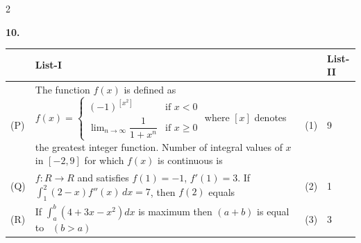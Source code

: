 \documentclass[10pt]{extarticle}
\newcommand{\qn}[1]{\par\smallskip\noindent\textbf{#1.}~}
\begin{document}
\begin{multicols}{2}
\qn{10} \begin{center}\footnotesize
\begin{tabular}{|p{0.6cm}|p{5.3cm}|p{0.6cm}|p{1.0cm}|}
\hline
 & \centering List-I & & \centering List-II\tabularnewline
\hline
(P) & The function $f(x)$ is defined as $f(x)=\begin{cases}(-1)^{[x^2]} & \text{if } x<0\\[2pt] \displaystyle\lim_{n\to\infty}\dfrac1{1+x^n} & \text{if } x\ge0\end{cases}$ where $[x]$ denotes the greatest integer function. Number of integral values of $x$ in $[-2,9]$ for which $f(x)$ is continuous is & (1) & 9\\
\hline
(Q) & $f:R\to R$ and satisfies $f(1)=-1$, $f'(1)=3$. If $\displaystyle\int_1^2(2-x)f''(x)\,dx=7$, then $f(2)$ equals & (2) & 1\\
\hline
(R) & If $\displaystyle\int_a^b\left(4+3x-x^2\right)dx$ is maximum then $(a+b)$ is equal to \ $(b>a)$ & (3) & 3\\
\hline
\end{tabular}
\end{center}

\end{multicols}
\end{document}

